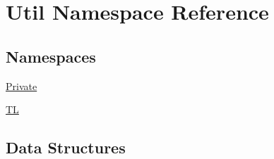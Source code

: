 \hypertarget{namespaceUtil}{}\section{Util Namespace Reference}
\label{namespaceUtil}
\subsection*{Namespaces}
\begin{DoxyCompactItemize}
\item 
 \mbox{\hyperlink{namespaceUtil_1_1Private}{Private}}
\item 
 \mbox{\hyperlink{namespaceUtil_1_1TL}{TL}}
\end{DoxyCompactItemize}
\subsection*{Data Structures}
